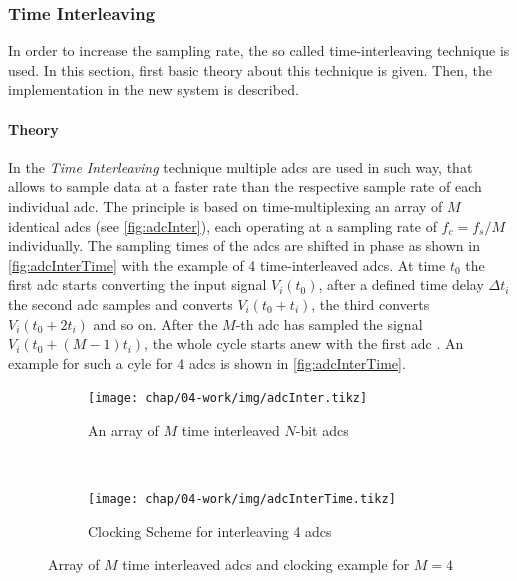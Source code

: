 \subsubsection{Time Interleaving}\label{sssec:time-interleaving}
In order to increase the sampling rate, the so called time-interleaving technique is used. In this section, first basic theory about this technique is given. Then, the implementation in the new system is described.

\paragraph{Theory}
In the \textit{Time Interleaving} technique multiple \glspl{adc} are used in such way, that allows to sample data at a faster rate than the respective sample rate of each individual \gls{adc}. 
The principle is based on time-multiplexing an array of $M$ identical \glspl{adc} (see \autoref{fig:adcInter}), each operating at a sampling rate of $f_c = f_s/M$ individually. 
The sampling times of the \glspl{adc} are shifted in phase as shown in \autoref{fig:adcInterTime} with the example of 4 time-interleaved \glspl{adc}.  
At time $t_0$ the first \gls{adc} starts converting the input signal $V_i(t_0)$, after a defined time delay $\Delta t_i$ the second \gls{adc} samples and converts $V_i(t_0 + t_i)$, the third converts $V_i(t_0 + 2t_i)$ and so on. 
After the $M$-th \gls{adc} has sampled the signal $V_i(t_0 + (M-1)t_i)$, the whole cycle starts anew with the first \gls{adc} \cite{mangrob}.
An example for such a cyle for 4 \glspl{adc} is shown in \autoref{fig:adcInterTime}.

\begin{figure}[tbh]
	\centering
	\begin{subfigure}{\textwidth}
		\centering
		\texttt{[image: chap/04-work/img/adcInter.tikz]}  
		\caption{An array of $M$ time interleaved $N$-bit \glspl{adc} \cite{mangrob}}
		\label{fig:adcInter}
	\end{subfigure}
	\\[3ex]
	\begin{subfigure}{\textwidth}
		\centering
		\tikzexternaldisable
		\texttt{[image: chap/04-work/img/adcInterTime.tikz]}  
		\caption{Clocking Scheme for interleaving 4 \glspl{adc}}
		\tikzexternalenable
		\label{fig:adcInterTime}
	\end{subfigure}
	\caption[Time-Interleaving Method]{Array of $M$ time interleaved \glspl{adc} and clocking example for $M = 4$}
	\label{fig:interleaving}
\end{figure}

